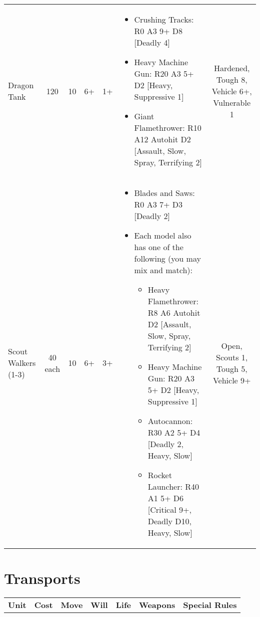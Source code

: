 \documentclass[landscape]{extarticle}
\begin{document}
\begin{small}
\begin{tabular}{UccccWS}
\\



Dragon Tank
&
120
&
10
&
6+
&
1+
&
\begin{itemize}
    \item Crushing Tracks: R0 A3 9+ D8 [Deadly 4]
    \item Heavy Machine Gun: R20 A3 5+ D2 [Heavy, Suppressive 1]
    \item Giant Flamethrower: R10 A12 Autohit D2 [Assault, Slow, Spray, Terrifying 2]
\end{itemize}
&
Hardened, Tough 8, Vehicle 6+, Vulnerable 1



\\



Scout Walkers (1-3)
&
40 each
&
10
&
6+
&
3+
&
\begin{itemize}
    \item Blades and Saws: R0 A3 7+ D3 [Deadly 2]
    \item Each model also has one of the following (you may mix and match):
    \begin{itemize}
        \item Heavy Flamethrower: R8 A6 Autohit D2 [Assault, Slow, Spray, Terrifying 2]
        \item Heavy Machine Gun: R20 A3 5+ D2 [Heavy, Suppressive 1]
        \item Autocannon: R30 A2 5+ D4 [Deadly 2, Heavy, Slow]
        \item Rocket Launcher: R40 A1 5+ D6 [Critical 9+, Deadly D10, Heavy, Slow]
    \end{itemize}
\end{itemize}
&
Open, Scouts 1, Tough 5, Vehicle 9+
\end{tabular}








\section*{Transports}

\begin{tabular}{UccccWS}

\textbf{Unit} & \textbf{Cost} & \textbf{Move} & \textbf{Will} & \textbf{Life} & \textbf{Weapons} & \textbf{Special Rules} \\



\end{tabular}
\end{small}
\end{document}
